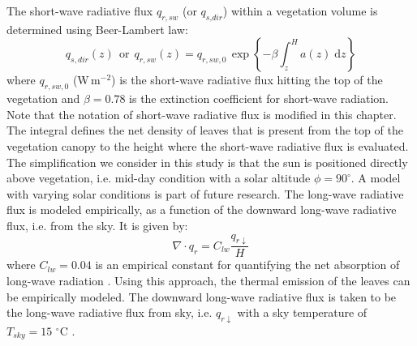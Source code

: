 
The short-wave radiative flux $q_{\mathit{r,sw}}$ (or $q_{\textit{s,dir}}$) within a vegetation volume is determined using Beer-Lambert law:
\begin{equation}
q_{s,dir}(z) ~~\mathrm{or}~~  {q_{r,sw}}(z) = {q_{r,sw,0}}\,{\exp}\left\{ - \beta \int_z^H {a\left( z \right)} \;\mathrm{d}z \right\}
\label{eq:beerlambert}
\end{equation}
where $q_{r,sw,0}$ (W\,m$^{-2}$) is the short-wave radiative flux hitting the top of the vegetation and $\beta=0.78$ is the extinction coefficient for short-wave radiation. Note that the notation of short-wave radiative flux is modified in this chapter. The integral defines the net density of leaves that is present from the top of the vegetation canopy to the height where the short-wave radiative flux is evaluated. The simplification we consider in this study is that the sun is positioned directly above vegetation, i.e. mid-day condition with a solar altitude $\phi=90^{\circ}$. A model with varying solar conditions is part of future research. The long-wave radiative flux is modeled empirically, as a function of the downward long-wave radiative flux, i.e. from the sky. It is given by:
\begin{equation}
\nabla  \cdot {q_{\mathit{r}}} = {C_{\mathit{lw}}}\frac{{{q_{\mathit{r} \downarrow }}}}{H}
\end{equation}
where $C_{lw}=0.04$ is an empirical constant for quantifying the net absorption of long-wave radiation \citep{Kichah2012}. Using this approach, the thermal emission of the leaves can be empirically modeled. The downward long-wave radiative flux is taken to be the long-wave radiative flux from sky, i.e. ${q_{\mathit{r} \downarrow }}$ with a sky temperature of $T_{\mathit{sky}}=15$ $^{\circ}$C \citep{Saneinejad2014}.

